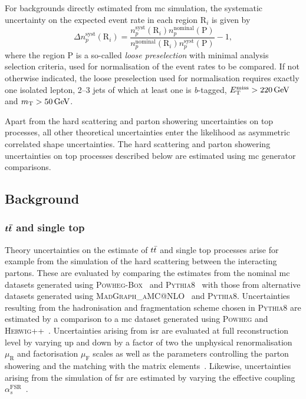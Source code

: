  For backgrounds directly estimated from \gls{mc} simulation, the systematic uncertainty on the expected event rate in each region R$_i$ is given by
 \begin{equation}
 	\Delta n_p^\mathrm{syst}(\mathrm{R}_i) = \frac{n_p^\mathrm{syst}(\mathrm{R}_i)n_p^\mathrm{nominal}(\mathrm{P})}{n_p^\mathrm{nominal}(\mathrm{R}_i)n_p^\mathrm{syst}(\mathrm{P})} - 1,
 \end{equation}
 where the region P is a so-called \textit{loose preselection} with minimal analysis selection criteria, used for normalisation of the event rates to be compared.
 If not otherwise indicated, the loose preselection used for normalisation requires exactly one isolated lepton, 2--3 jets of which at least one is \textit{b}-tagged, $\etmiss>\SI{220}{\GeV}$ and $\mt>\SI{50}{\GeV}$.
 
 Apart from the hard scattering and parton showering uncertainties on top processes, all other theoretical uncertainties enter the likelihood as asymmetric correlated shape uncertainties.
 The hard scattering and parton showering uncertainties on top processes described below are estimated using \gls{mc} generator comparisons.
 
 \subsection{Background}
 
 \subsubsection{$\makemebold{\ttbar}$ and single top}
 
 Theory uncertainties on the estimate of $t\bar{t}$ and single top processes arise for example from the simulation of the hard scattering between the interacting partons.
 These are evaluated by comparing the estimates from the nominal \gls{mc} datasets generated using \textsc{Powheg-Box}~\cite{PowhegBox:2010xd} and \textsc{Pythia8}~\cite{Pythia8:2007gs} with those from alternative datasets generated using \textsc{MadGraph\_aMC@NLO}~\cite{MGaMCNLO:2014hca,Frederix:2012ps} and \textsc{Pythia8}.
 Uncertainties resulting from the hadronisation and fragmentation scheme chosen in \textsc{Pythia8} are estimated by a comparison to a \gls{mc} dataset generated using \textsc{Powheg} and \textsc{Herwig++}~\cite{Herwig:2015jjp}.
 Uncertainties arising from \gls{isr} are evaluated at full reconstruction level by varying up and down by a factor of two the unphysical renormalisation $\mu_\mathrm{R}$ and factorisation $\mu_\mathrm{F}$ scales as well as the parameters controlling the parton showering and the matching with the matrix elements~\cite{ATL-PHYS-PUB-2016-004}.
 Likewise, uncertainties arising from the simulation of \gls{fsr} are estimated by varying the effective coupling $\alpha_s^{\mathrm{FSR}}$~\cite{ATL-PHYS-PUB-2016-004}. 
 
